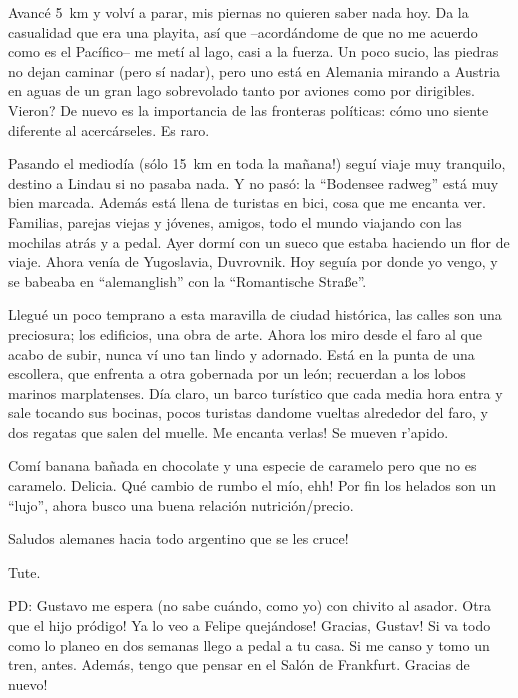 Avanc\'e 5~km y volv\'i a parar, mis piernas no quieren saber nada hoy. Da la
casualidad que era una playita, as\'i que --acord\'andome de que no me acuerdo
como es el Pac\'ifico-- me met\'i al lago, casi a la fuerza. Un poco sucio,
las piedras no dejan caminar (pero s\'i nadar), pero uno est\'a en Alemania
mirando a Austria en aguas de un gran lago sobrevolado tanto por aviones como
por dirigibles. \textquestiondown Vieron? De nuevo es la importancia de las
fronteras pol\'iticas: c\'omo uno siente diferente al acerc\'arseles. Es raro.

Pasando el mediod\'ia (\textexclamdown s\'olo 15~km en toda la ma\~nana!)
segu\'i viaje muy tranquilo, destino a Lindau si no pasaba nada. Y no pas\'o:
la ``Bodensee radweg'' est\'a muy bien marcada. Adem\'as est\'a llena de
turistas en bici, cosa que me encanta ver. Familias, parejas viejas y
j\'ovenes, amigos, todo el mundo viajando con las mochilas atr\'as y a pedal.
Ayer dorm\'i con un sueco que estaba haciendo un flor de viaje. Ahora
ven\'ia de Yugoslavia, Duvrovnik. Hoy segu\'ia por donde yo vengo, y se
babeaba en ``alemanglish'' con la ``Romantische Stra\ss e''.

Llegu\'e un poco temprano a esta maravilla de ciudad hist\'orica, las calles
son una preciosura; los edificios, una obra de arte. Ahora los miro desde el
faro al que acabo de subir, nunca v\'i uno tan lindo y adornado. Est\'a en la
punta de una escollera, que enfrenta a otra gobernada por un le\'on; recuerdan a
los lobos marinos marplatenses. D\'ia claro, un barco tur\'istico que cada media
hora entra y sale tocando sus bocinas, pocos turistas dandome vueltas alrededor
del faro, y dos regatas que salen del muelle. \textexclamdown Me encanta verlas!
Se mueven r'apido.

Com\'i banana ba\~nada en chocolate y una especie de caramelo pero que no es
caramelo. Delicia. \textexclamdown Qu\'e cambio de rumbo el m\'io, ehh! Por
fin los helados son un ``lujo'', ahora busco una buena relaci\'on
nutrici\'on/precio.

\textexclamdown Saludos alemanes hacia todo argentino que se les cruce!

Tute.

PD: Gustavo me espera (no sabe cu\'ando, como yo) con chivito al asador.
\textexclamdown Otra que el hijo pr\'odigo! \textexclamdown Ya lo veo a Felipe
quej\'andose! \textexclamdown Gracias, Gustav! Si va todo como lo planeo en
dos semanas llego a pedal a tu casa. Si me canso y tomo un tren, antes.
Adem\'as, tengo que pensar en el Sal\'on de Frankfurt. \textexclamdown Gracias
de nuevo!

